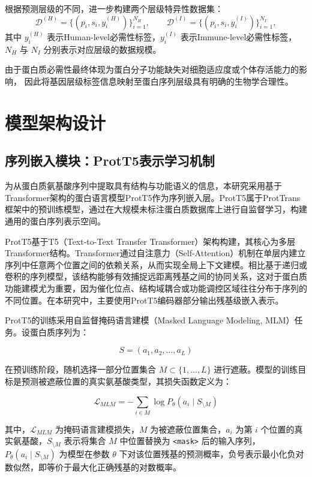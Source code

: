 根据预测层级的不同，进一步构建两个层级特异性数据集：
\begin{equation}
\mathcal{D}^{(H)} = \{(p_i, s_i, y_i^{(H)})\}_{i=1}^{N_H}, \qquad
\mathcal{D}^{(I)} = \{(p_i, s_i, y_i^{(I)})\}_{i=1}^{N_I},
\end{equation}
其中 $y_i^{(H)}$ 表示Human-level必需性标签，$y_i^{(I)}$ 表示Immune-level必需性标签，$N_H$ 与 $N_I$ 分别表示对应层级的数据规模。

由于蛋白质必需性最终体现为蛋白分子功能缺失对细胞适应度或个体存活能力的影响，
因此将基因层级标签信息映射至蛋白序列层级具有明确的生物学合理性。

\section{模型架构设计}
\subsection{序列嵌入模块：ProtT5表示学习机制}

为从蛋白质氨基酸序列中提取具有结构与功能语义的信息，本研究采用基于Transformer架构的蛋白语言模型ProtT5作为序列嵌入层。ProtT5属于ProtTrans框架中的预训练模型，通过在大规模未标注蛋白质数据库上进行自监督学习，构建通用的蛋白序列表示空间。

ProtT5基于T5（Text-to-Text Transfer Transformer）架构构建，其核心为多层Transformer结构。Transformer通过自注意力（Self-Attention）机制在单层内建立序列中任意两个位置之间的依赖关系，从而实现全局上下文建模。相比基于递归或卷积的序列模型，该结构能够有效捕捉远距离残基之间的协同关系，这对于蛋白质功能建模尤为重要，因为催化位点、结构域耦合或功能调控区域往往分布于序列的不同位置。在本研究中，主要使用ProtT5编码器部分输出残基级嵌入表示。

ProtT5的训练采用自监督掩码语言建模（Masked Language Modeling, MLM）任务。设蛋白质序列为：

\begin{equation}
S = (a_1, a_2, \dots, a_L)
\end{equation}

在预训练阶段，随机选择一部分位置集合 $M \subset \{1, \dots, L\}$ 进行遮蔽。模型的训练目标是预测被遮蔽位置的真实氨基酸类型，其损失函数定义为：

\begin{equation}
\mathcal{L}_{MLM}
=
- \sum_{i \in M}
\log P_\theta(a_i \mid S_{\setminus M})
\end{equation}

其中，$\mathcal{L}_{MLM}$ 为掩码语言建模损失，$M$ 为被遮蔽位置集合，$a_i$ 为第 $i$ 个位置的真实氨基酸，$S_{\setminus M}$ 表示将集合 $M$ 中位置替换为 \texttt{<mask>} 后的输入序列，$P_\theta(a_i \mid S_{\setminus M})$ 为模型在参数 $\theta$ 下对该位置残基的预测概率，负号表示最小化负对数似然，即等价于最大化正确残基的对数概率。

